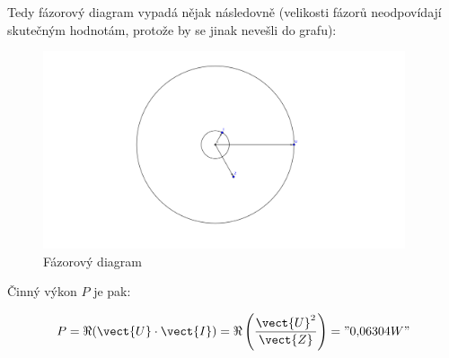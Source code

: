 \documentclass{fkssolpub}
\begin{document}
\newpage

Tedy fázorový diagram vypadá nějak následovně (velikosti fázorů neodpovídají skutečným hodnotám, protože by se jinak nevešli do grafu):

\begin{figure}[h!]
	\begin{center}
		\includegraphics[width=0.95\textwidth]{3-fig.png}
	\end{center}
	\caption{Fázorový diagram}
	\label{fig:1}
\end{figure}


Činný výkon $P$ je pak:

\[
	P = \Re(\vect{U} \cdot \vect{I}) = \Re\left(\frac{\vect{U}^2}{\vect{Z}}\right) = "0{,}06304 W"
\]
\end{document}
